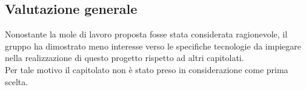 \subsection{Valutazione generale}
Nonostante la mole di lavoro proposta fosse stata considerata ragionevole, il gruppo ha dimostrato meno interesse verso le specifiche tecnologie da impiegare nella realizzazione di questo progetto rispetto ad altri capitolati. \\
Per tale motivo il capitolato non è stato preso in considerazione come prima scelta.


